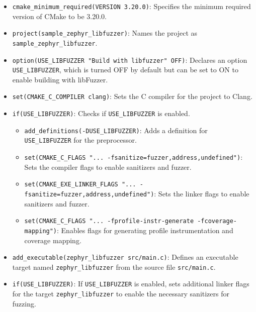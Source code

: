\begin{itemize}
    \item \texttt{cmake\_minimum\_required(VERSION 3.20.0)}: Specifies the minimum required version of CMake to be 3.20.0.

    \item \texttt{project(sample\_zephyr\_libfuzzer)}: Names the project as \texttt{sample\_zephyr\_libfuzzer}.

    \item \texttt{option(USE\_LIBFUZZER "Build with libfuzzer" OFF)}: Declares an option \texttt{USE\_LIBFUZZER}, which is turned OFF by default but can be set to ON to enable building with libFuzzer.

    \item \texttt{set(CMAKE\_C\_COMPILER clang)}: Sets the C compiler for the project to Clang.

    \item \texttt{if(USE\_LIBFUZZER)}: Checks if \texttt{USE\_LIBFUZZER} is enabled.

    \begin{itemize}
        \item \texttt{add\_definitions(-DUSE\_LIBFUZZER)}: Adds a definition for \texttt{USE\_LIBFUZZER} for the preprocessor.

        \item \texttt{set(CMAKE\_C\_FLAGS "... -fsanitize=fuzzer,address,undefined")}: Sets the compiler flags to enable sanitizers and fuzzer.

        \item \texttt{set(CMAKE\_EXE\_LINKER\_FLAGS "... -fsanitize=fuzzer,address,undefined")}: Sets the linker flags to enable sanitizers and fuzzer.

        \item \texttt{set(CMAKE\_C\_FLAGS "... -fprofile-instr-generate -fcoverage-mapping")}: Enables flags for generating profile instrumentation and coverage mapping.
    \end{itemize}

    \item \texttt{add\_executable(zephyr\_libfuzzer src/main.c)}: Defines an executable target named \texttt{zephyr\_libfuzzer} from the source file \texttt{src/main.c}.

    \item \texttt{if(USE\_LIBFUZZER)}: If \texttt{USE\_LIBFUZZER} is enabled, sets additional linker flags for the target \texttt{zephyr\_libfuzzer} to enable the necessary sanitizers for fuzzing.
\end{itemize}

